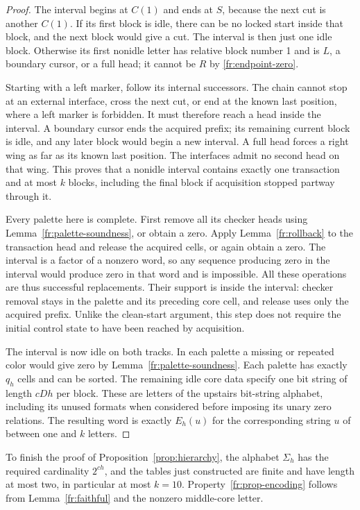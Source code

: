\begin{proof}
The interval begins at $C(1)$ and ends at $S$, because the next
cut is another $C(1)$.  If its first block is idle, there can be
no locked start inside that block, and the next block would
give a cut.  The interval is then just one idle block.  Otherwise
its first nonidle letter has relative block number 1 and is
$L$, a boundary cursor, or a full head; it cannot be $R$ by
\eqref{fr:endpoint-zero}.

Starting with a left marker, follow its internal successors.
The chain cannot stop at an external interface, cross the next
cut, or end at the known last position, where a left marker is
forbidden.  It must therefore reach a head inside the interval.
A boundary cursor ends the acquired prefix; its remaining
current block is idle, and any later block would begin a new
interval.  A full head forces a right wing as far as its known
last position.  The interfaces admit no second head on that
wing.  This proves that a nonidle interval contains exactly one
transaction and at most $k$ blocks, including the final block
if acquisition stopped partway through it.

Every palette here is complete.  First remove all its checker
heads using Lemma~\ref{fr:palette-soundness}, or obtain a zero.
Apply Lemma~\ref{fr:rollback} to the transaction head and release
the acquired cells, or again obtain a zero.  The interval is a
factor of a nonzero word, so any sequence producing zero in the
interval would produce zero in that word and is impossible.
All these operations are thus successful replacements. Their support
is inside the interval: checker removal stays in the palette and its
preceding core cell, and release uses only the acquired prefix. Unlike the
clean-start argument, this step does not require the initial control
state to have been reached by acquisition.

The interval is now idle on both tracks.  In each palette a
missing or repeated color would give zero by
Lemma~\ref{fr:palette-soundness}.  Each palette has exactly
$q_h$ cells and can be sorted.  The remaining idle core data
specify one bit string of length $cDh$ per block.  These are
letters of the upstairs bit-string alphabet, including its
unused formats when considered before imposing its unary zero
relations.  The resulting word is exactly $E_h(u)$ for the
corresponding string $u$ of between one and $k$ letters.
\end{proof}

To finish the proof of Proposition~\ref{prop:hierarchy}, the alphabet
$\Sigma_h$ has the required cardinality $2^{ch}$, and the tables
just constructed are finite and have length
at most two, in particular at most $k=10$.
Property~\ref{fr:prop-encoding} follows from
Lemma~\ref{fr:faithful} and the nonzero middle-core letter.

